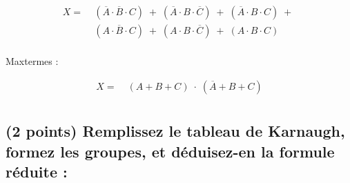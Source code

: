 \documentclass[11pt,a4paper]{article}
\begin{document}
\begin{table}[!ht]
\begin{minipage}{0.50\textwidth}
\vspace*{-0.5cm}

\begin{equation*}
    \begin{split}
X = \; & ( \overline{A} \cdot \overline{B} \cdot C ) \; + \; ( \overline{A} \cdot B \cdot \overline{C} ) \; + \; ( \overline{A} \cdot B \cdot C ) \; + \; \\
    & ( A \cdot \overline{B} \cdot C ) \; + \; ( A \cdot B \cdot \overline{C} ) \; + \; ( A \cdot B \cdot C ) \\
    \end{split}
\end{equation*}


\bigskip


Maxtermes :

\vspace*{-0.5cm}

\begin{equation*}
    \begin{split}
X = \; & ( A + B + C ) \; \cdot \; ( \overline{A} + B + C) \\
    \end{split}
\end{equation*}

\vspace*{2cm}

  \end{minipage}
\end{table}


\vspace*{-0.25cm}


\subsection{(2 points) Remplissez le tableau de Karnaugh, formez les groupes, et déduisez-en la formule réduite : }

\end{document}

